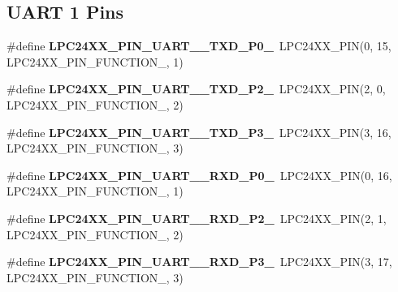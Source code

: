 \subsection*{U\+A\+RT 1 Pins}
\begin{DoxyCompactItemize}
\item 
\mbox{\label{group__lpc24xx__io_ga925362090d0455215898a9004512449e}} 
\#define {\bfseries L\+P\+C24\+X\+X\+\_\+\+P\+I\+N\+\_\+\+U\+A\+R\+T\+\_\+\_\+\+T\+X\+D\+\_\+\+P0\+\_}~L\+P\+C24\+X\+X\+\_\+\+P\+IN(0, 15, L\+P\+C24\+X\+X\+\_\+\+P\+I\+N\+\_\+\+F\+U\+N\+C\+T\+I\+O\+N\+\_, 1)
\item 
\mbox{\label{group__lpc24xx__io_ga42dd6f261cedeef239eb5e5f2d53abdd}} 
\#define {\bfseries L\+P\+C24\+X\+X\+\_\+\+P\+I\+N\+\_\+\+U\+A\+R\+T\+\_\+\_\+\+T\+X\+D\+\_\+\+P2\+\_}~L\+P\+C24\+X\+X\+\_\+\+P\+IN(2, 0, L\+P\+C24\+X\+X\+\_\+\+P\+I\+N\+\_\+\+F\+U\+N\+C\+T\+I\+O\+N\+\_, 2)
\item 
\mbox{\label{group__lpc24xx__io_ga65190611fecfb7f76a1ecfed8004adf7}} 
\#define {\bfseries L\+P\+C24\+X\+X\+\_\+\+P\+I\+N\+\_\+\+U\+A\+R\+T\+\_\+\_\+\+T\+X\+D\+\_\+\+P3\+\_}~L\+P\+C24\+X\+X\+\_\+\+P\+IN(3, 16, L\+P\+C24\+X\+X\+\_\+\+P\+I\+N\+\_\+\+F\+U\+N\+C\+T\+I\+O\+N\+\_, 3)
\item 
\mbox{\label{group__lpc24xx__io_ga556b4bf1fa4d718d4108e098b1b7d42a}} 
\#define {\bfseries L\+P\+C24\+X\+X\+\_\+\+P\+I\+N\+\_\+\+U\+A\+R\+T\+\_\+\_\+\+R\+X\+D\+\_\+\+P0\+\_}~L\+P\+C24\+X\+X\+\_\+\+P\+IN(0, 16, L\+P\+C24\+X\+X\+\_\+\+P\+I\+N\+\_\+\+F\+U\+N\+C\+T\+I\+O\+N\+\_, 1)
\item 
\mbox{\label{group__lpc24xx__io_ga21b8c4d68bdf19f449339dfec06024ec}} 
\#define {\bfseries L\+P\+C24\+X\+X\+\_\+\+P\+I\+N\+\_\+\+U\+A\+R\+T\+\_\+\_\+\+R\+X\+D\+\_\+\+P2\+\_}~L\+P\+C24\+X\+X\+\_\+\+P\+IN(2, 1, L\+P\+C24\+X\+X\+\_\+\+P\+I\+N\+\_\+\+F\+U\+N\+C\+T\+I\+O\+N\+\_, 2)
\item 
\mbox{\label{group__lpc24xx__io_ga5d42058b3ccf233f559dda09463fc5de}} 
\#define {\bfseries L\+P\+C24\+X\+X\+\_\+\+P\+I\+N\+\_\+\+U\+A\+R\+T\+\_\+\_\+\+R\+X\+D\+\_\+\+P3\+\_}~L\+P\+C24\+X\+X\+\_\+\+P\+IN(3, 17, L\+P\+C24\+X\+X\+\_\+\+P\+I\+N\+\_\+\+F\+U\+N\+C\+T\+I\+O\+N\+\_, 3)
\end{DoxyCompactItemize}

